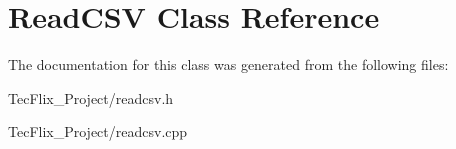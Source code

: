 \hypertarget{classReadCSV}{}\section{Read\+C\+SV Class Reference}
\label{classReadCSV}


The documentation for this class was generated from the following files\+:\begin{DoxyCompactItemize}
\item 
Tec\+Flix\+\_\+\+Project/readcsv.\+h\item 
Tec\+Flix\+\_\+\+Project/readcsv.\+cpp\end{DoxyCompactItemize}
